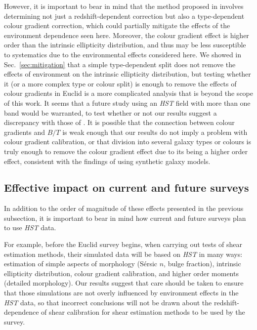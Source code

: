 \documentclass[twocolumn,useAMS,usenatbib]{mn2e}
\newcommand{\sersic}{S\'{e}rsic }
\begin{document}
However, it is important to bear in mind that the method
  proposed in \cite{2013MNRAS.432.2385S} involves determining not just
a redshift-dependent correction but also a type-dependent colour
gradient correction, which could partially mitigate the effects of the
environment dependence seen here.  Moreover, the colour gradient
effect is higher order than the intrinsic ellipticity distribution,
and thus may be less susceptible to systematics due to the
environmental effects considered here.   We showed in
Sec.~\ref{sec:mitigation} that a simple type-dependent split does not
remove the effects of environment on the intrinsic ellipticity
distribution, but testing whether it (or a more complex type or colour
split) is
enough to remove the effects of colour gradients in Euclid is a more
complicated analysis that is beyond the scope of this work. It seems that a future study using
  an {\em HST} field with more than one band would be warranted, to
  test whether or not our results suggest a discrepancy with those
    of 
  \cite{2013MNRAS.432.2385S}.  It is possible that the connection between
  colour gradients and $B/T$ is weak enough that our results do not imply a
  problem with colour gradient calibration, or that 
    division into several galaxy types or colours is truly enough to remove the colour
    gradient effect due to its being a higher order effect, consistent with the findings of 
    \cite{2013MNRAS.432.2385S} using synthetic galaxy models.

\subsection{Effective impact on current and future surveys}

In addition to the order of magnitude of these effects
  presented in the previous subsection, it is important to bear in
  mind how current and future surveys plan to use {\em HST} data.

For example, before the Euclid survey begins, when carrying
  out tests of shear estimation methods, their simulated data will be
  based on {\em HST} in many ways: estimation of simple aspects of
  morphology (\sersic $n$, bulge fraction), intrinsic ellipticity
  distribution, colour gradient calibration, and higher order moments
  (detailed morphology).  Our results suggest that care should be
  taken to ensure that those simulations are not overly influenced by
  environment effects in the {\em HST} data, so that incorrect
  conclusions will not be drawn about the redshift-dependence of shear
  calibration for shear estimation methods to be used by the survey.
\end{document}
